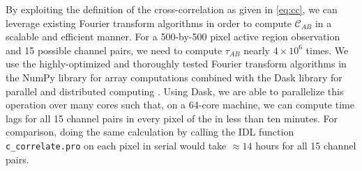 By exploiting the definition of the cross-correlation as given in \autoref{eq:cc}, we can leverage existing Fourier transform algorithms in order to compute $\mathcal{C}_{AB}$ in a scalable and efficient manner. For a 500-by-500 pixel active region observation and 15 possible channel pairs, we need to compute $\tau_{AB}$ nearly $4\times10^6$ times. We use the highly-optimized and thoroughly tested Fourier transform algorithms in the NumPy library for array computations \citep{oliphant_guide_2006} combined with the Dask library for parallel and distributed computing \citep{rocklin_dask_2015}. Using Dask, we are able to parallelize this operation over many cores such that, on a 64-core machine, we can compute time lags for all 15 channel pairs in every pixel of the \AR{} in less than ten minutes. For comparison, doing the same calculation by calling the IDL function \texttt{c\_correlate.pro} on each pixel in serial would take $\approx14$ hours for all 15 channel pairs.
